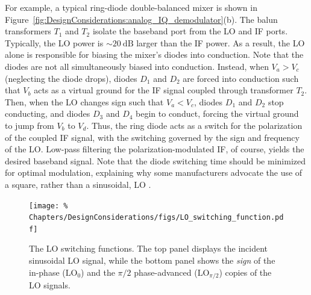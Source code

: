 For example, a typical ring-diode double-balanced mixer
\cite{analog_devices_mix_and_mod}
is shown in Figure~\ref{fig:DesignConsiderations:analog_IQ_demodulator}(b).
The balun transformers $T_1$ and $T_2$
isolate the baseband port from the LO and IF ports.
Typically, the LO power is $\sim \SI{20}{\deci\bel}$ larger than the IF power.
As a result, the LO alone is responsible
for biasing the mixer's diodes into conduction.
Note that the diodes are not all simultaneously biased into conduction.
Instead, when $V_a > V_c$ (neglecting the diode drops),
diodes $D_1$ and $D_2$ are forced into conduction such that
$V_b$ acts as a virtual ground for the IF signal
coupled through transformer $T_2$.
Then, when the LO changes sign such that $V_a < V_c$,
diodes $D_1$ and $D_2$ stop conducting, and
diodes $D_3$ and $D_4$ begin to conduct,
forcing the virtual ground to jump from $V_b$ to $V_d$.
Thus, the ring diode acts as a switch
for the polarization of the coupled IF signal,
with the switching governed by the sign and frequency of the LO.
Low-pass filtering the polarization-modulated IF, of course,
yields the desired baseband signal.
Note that the diode switching time should be minimized
for optimal modulation,
explaining why some manufacturers
advocate the use of a square, rather than a sinusoidal, LO
\cite{minicircuits_mixer_faqs}.

\begin{figure}
  \centering
  \texttt{[image: \%
    Chapters/DesignConsiderations/figs/LO\_switching\_function.pdf]}
  \caption[LO switching functions]{%
    The LO switching functions.
    The top panel displays the incident sinusoidal LO signal, while
    the bottom panel shows the \emph{sign} of
    the in-phase ($\text{LO}_0$) and
    the $\pi / 2$ phase-advanced ($\text{LO}_{\pi / 2}$)
    copies of the LO signals.}
  \label{fig:DesignConsiderations:LO_switching_function}
\end{figure}

